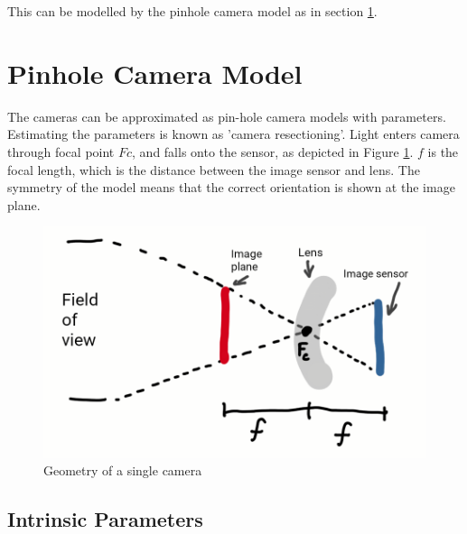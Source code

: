 This can be modelled by the pinhole camera model as in section \ref{sec:pinhole}.

%
%
%

\section{Pinhole Camera Model}
\label{sec:pinhole}

The cameras can be approximated as pin-hole camera models with parameters. Estimating the parameters is known as 'camera resectioning'. Light enters camera through focal point $Fc$, and falls onto the sensor, as depicted in Figure \ref{fig:camera_geometry}. $f$ is the focal length, which is the distance between the image sensor and lens. The symmetry of the model means that the correct orientation is shown at the image plane.

\begin{figure}[H]
\centering
\includegraphics[scale=0.35]{images/camera_geometry.png}
\caption{Geometry of a single camera}
\label{fig:camera_geometry}
\end{figure}



\subsection{Intrinsic Parameters}
\label{sec:intrinsic}

